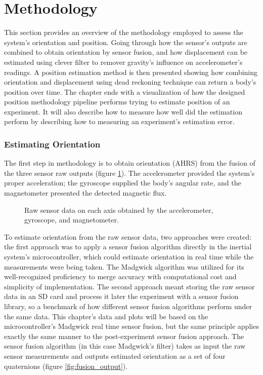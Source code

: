 \section{Methodology}

This section provides an overview of the methodology employed to assess the system's orientation and position. Going through how the sensor's outputs are combined to obtain orientation by sensor fusion, and how displacement can be estimated using clever filter to remover gravity's influence on accelerometer's readings. A position estimation method is then presented showing how combining orientation and displacement using dead reckoning technique can return a body's position over time. The chapter ends with a visualization of how the designed position methodology pipeline performs trying to estimate position of an experiment. It will also describe how to measure how well did the estimation perform by describing how to measuring an experiment's estimation error.


\subsubsection{Estimating Orientation}

The first step in methodology is to obtain orientation (AHRS) from the fusion of the three sensor raw outputs (figure \ref{fig:raw}). The accelerometer provided the system's proper acceleration; the gyroscope supplied the body's angular rate, and the magnetometer presented the detected magnetic flux.

\begin{figure}[!h]
    \centering
    \resizebox{0.75\linewidth}{!}{}
    \caption{Raw sensor data on each axis obtained by the accelerometer, gyroscope, and magnetometer.}
    \label{fig:raw}
\end{figure}

To estimate orientation from the raw sensor data, two approaches were created: the first approach was to apply a sensor fusion algorithm directly in the inertial system's microcontroller, which could estimate orientation in real time while the measurements were being taken. The Madgwick algorithm was utilized for its well-recognized proficiency to merge accuracy with computational cost and simplicity of implementation. The second approach meant storing the raw sensor data in an SD card and process it later the experiment with a sensor fusion library, so a benchmark of how different sensor fusion algorithms perform under the same data. This chapter's data and plots will be based on the microcontroller's Madgwick real time sensor fusion, but the same principle applies exactly the same manner to the post-experiment sensor fusion approach. The sensor fusion algorithm (in this case Madgwick's filter) takes as input the raw sensor measurements and outputs estimated orientation as a set of four quaternions (figure \ref{fig:fusion_output}).

